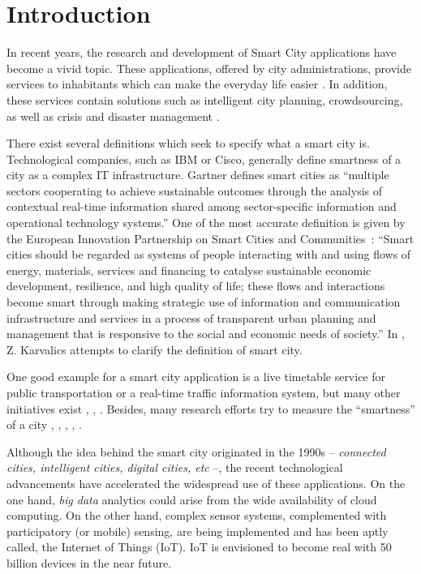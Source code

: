\documentclass[b5paper,12pt]{report}
\theoremstyle{definition}
\begin{document}
\chapter{Introduction}

In recent years, the research and development of Smart City applications have become a vivid topic. These applications, offered by city administrations, provide services to inhabitants which can make the everyday life easier \cite{ismagilova2019smart}. In addition, these services contain solutions such as intelligent city planning, crowdsourcing, as well as crisis and disaster management \cite{Zheng2014}.

There exist several definitions which seek to specify what a smart city is. Technological companies, such as IBM or Cisco, generally define smartness of a city as a complex IT infrastructure. Gartner defines smart cities as \enquote{multiple sectors cooperating to achieve sustainable outcomes through the analysis of contextual real-time information shared among sector-specific information and operational technology systems.} One of the most accurate definition is given by the European Innovation Partnership on Smart Cities and Communities~\cite{eipscc}: \enquote{Smart cities should be regarded as systems of people interacting with and using flows of energy, materials, services and financing to catalyse sustainable economic development, resilience, and high quality of life; these flows and interactions become smart through making strategic use of information and communication infrastructure and services in a process of transparent urban planning and management that is responsive to the social and economic needs of society.} In \cite{z2017okos}, Z. Karvalics attempts to clarify the definition of smart city.

One good example for a smart city application is a live timetable service for public transportation or a real-time traffic information system, but many other initiatives exist \cite{icity}, \cite{fiware}, \cite{futureglasgow}. Besides, many research efforts try to measure the \enquote{smartness} of a city \cite{carli2013measuring}, \cite{de2014smart}, \cite{neirotti2014current}, \cite{yamauchi2014development}, \cite{giffinger2007smart}. 

Although the idea behind the smart city originated in the 1990s -- \textit{connected cities, intelligent cities, digital cities, etc} --, the recent technological advancements have accelerated the widespread use of these applications. On the one hand, \textit{big data} analytics could arise from the wide availability of cloud computing. On the other hand, complex sensor systems, complemented with participatory (or mobile) sensing, are being implemented and has been aptly called, the Internet of Things (IoT). IoT is envisioned to become real with 50 billion devices in the near future.
\end{document}
